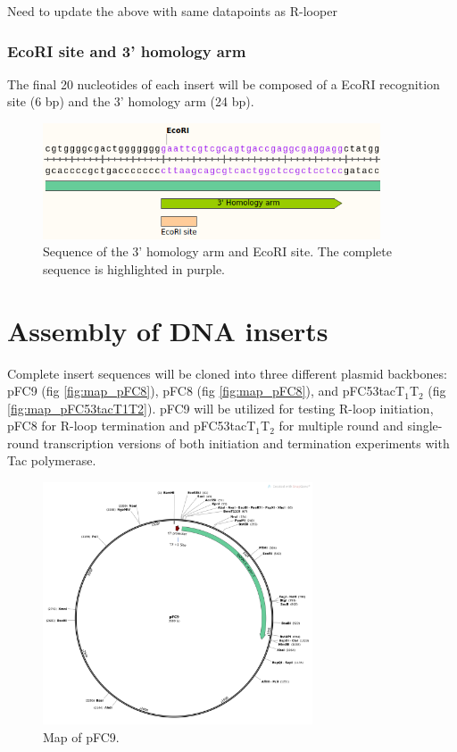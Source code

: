 \documentclass[11pt]{article}
\begin{document}
Need to update the above with same datapoints as R-looper

\subsubsection{EcoRI site and 3' homology arm}

The final 20 nucleotides of each insert will be composed of a EcoRI recognition site (6 bp) and the 3' homology arm (24 bp). 

\begin{figure}[H]
	\includegraphics[width=10cm]{images/variable_region/3_homology_arm.png}
	\centering
	\caption{Sequence of the 3' homology arm and EcoRI site. The complete sequence is highlighted in purple.}
	\label{fig:3_prime_arm}
\end{figure}



\section{Assembly of DNA inserts}

Complete insert sequences will be cloned into three different plasmid backbones: pFC9 (fig \ref{fig:map_pFC8}), pFC8 (fig \ref{fig:map_pFC8}), and pFC53tacT$_1$T$_2$ (fig \ref{fig:map_pFC53tacT1T2}). pFC9 will be utilized for testing R-loop initiation, pFC8 for R-loop termination and pFC53tacT$_1$T$_2$ for multiple round and single-round transcription versions of both initiation and termination experiments with Tac polymerase. 


\begin{figure}[H]
	\includegraphics[width=8cm]{images/plasmid_maps/pFC9_Map.png}
	\centering
	\caption{Map of pFC9.}
	\label{fig:map_pFC9}
\end{figure}
\end{document}
